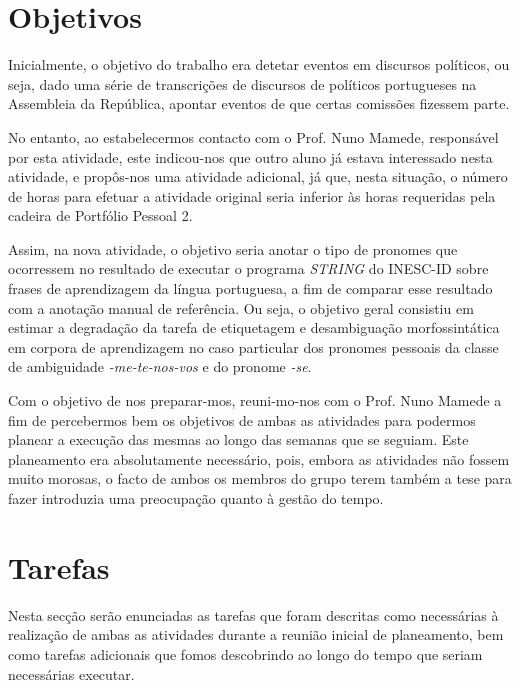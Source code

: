 \documentclass[a4paper,12pt,journal,twoside,compsoc]{PPIEEEtran}
\begin{document}

\section{Objetivos}
\label{goals}

Inicialmente, o objetivo do trabalho era detetar eventos em discursos políticos, ou seja, dado uma série de transcrições de discursos de políticos portugueses na Assembleia da República, apontar eventos de que certas comissões fizessem parte.

No entanto, ao estabelecermos contacto com o Prof. Nuno Mamede, responsável por esta atividade, este indicou-nos que outro aluno já estava interessado nesta atividade, e propôs-nos uma atividade adicional, já que, nesta situação, o número de horas para efetuar a atividade original seria inferior às horas requeridas pela cadeira de Portfólio Pessoal 2.

Assim, na nova atividade, o objetivo seria anotar o tipo de pronomes que ocorressem no resultado de executar o programa \textit{STRING} do INESC-ID sobre frases de aprendizagem da língua portuguesa, a fim de comparar esse resultado com a anotação manual de referência. Ou seja, o objetivo geral consistiu em estimar a degradação da tarefa de etiquetagem e desambiguação morfossintática em corpora de aprendizagem no caso particular dos pronomes pessoais da classe de ambiguidade \textit{-me-te-nos-vos} e do pronome \textit{-se}.

Com o objetivo de nos preparar-mos, reuni-mo-nos com o Prof. Nuno Mamede a fim de percebermos bem os objetivos de ambas as atividades para podermos planear a execução das mesmas ao longo das semanas que se seguiam. Este planeamento era absolutamente necessário, pois, embora as atividades não fossem muito morosas, o facto de ambos os membros do grupo terem também a tese para fazer introduzia uma preocupação quanto à gestão do tempo.

\section{Tarefas}
\label{tasks}

Nesta secção serão enunciadas as tarefas que foram descritas como necessárias à realização de ambas as atividades durante a reunião inicial de planeamento, bem como tarefas adicionais que fomos descobrindo ao longo do tempo que seriam necessárias executar.
\end{document}
